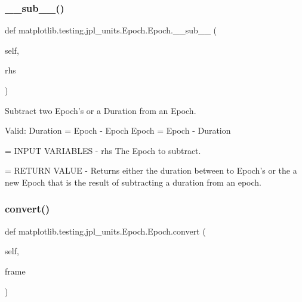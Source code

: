 \subsubsection{\texorpdfstring{\+\_\+\+\_\+sub\+\_\+\+\_\+()}{\_\_sub\_\_()}}
{\footnotesize\ttfamily def matplotlib.\+testing.\+jpl\+\_\+units.\+Epoch.\+Epoch.\+\_\+\+\_\+sub\+\_\+\+\_\+ (\begin{DoxyParamCaption}\item[{}]{self,  }\item[{}]{rhs }\end{DoxyParamCaption})}

\begin{DoxyVerb}Subtract two Epoch's or a Duration from an Epoch.

Valid:
Duration = Epoch - Epoch
Epoch = Epoch - Duration

= INPUT VARIABLES
- rhs     The Epoch to subtract.

= RETURN VALUE
- Returns either the duration between to Epoch's or the a new
  Epoch that is the result of subtracting a duration from an epoch.
\end{DoxyVerb}
 \mbox{\label{classmatplotlib_1_1testing_1_1jpl__units_1_1Epoch_1_1Epoch_a6a825a08a00b027f690c269156536fea}} 
\subsubsection{\texorpdfstring{convert()}{convert()}}
{\footnotesize\ttfamily def matplotlib.\+testing.\+jpl\+\_\+units.\+Epoch.\+Epoch.\+convert (\begin{DoxyParamCaption}\item[{}]{self,  }\item[{}]{frame }\end{DoxyParamCaption})}

\mbox{\label{classmatplotlib_1_1testing_1_1jpl__units_1_1Epoch_1_1Epoch_ac62742192c43096760576a5179b46ea6}} 
